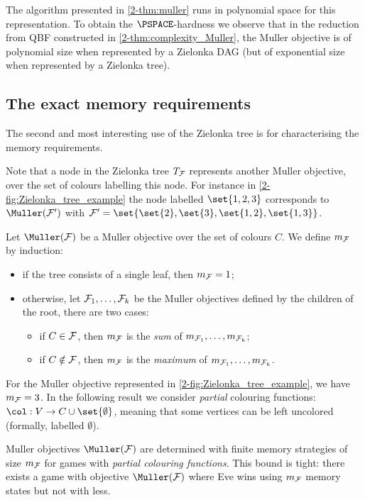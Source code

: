 The algorithm presented in \cref{2-thm:muller} runs in polynomial space for this representation.
To obtain the $\PSPACE$-hardness we observe that in the reduction from QBF constructed in \cref{2-thm:complexity_Muller},
the Muller objective is of polynomial size when represented by a Zielonka DAG (but of exponential size when represented by a Zielonka tree).

\subsection*{The exact memory requirements}
The second and most interesting use of the Zielonka tree is for characterising the memory requirements.

Note that a node in the Zielonka tree $T_{\mathcal{F}}$ represents another Muller objective, over the set of colours labelling this node.
For instance in \cref{2-fig:Zielonka_tree_example} the node labelled $\set{1,2,3}$ corresponds to $\Muller(\F')$ with
$\F' = \set{\set{2}, \set{3}, \set{1,2}, \set{1,3}}$.

\begin{definition}
\label{2-def:memory_requirements_Muller_objectives}
Let $\Muller(\F)$ be a Muller objective over the set of colours $C$.
We define $m_{\mathcal{F}}$ by induction:
\begin{itemize}
	\item if the tree consists of a single leaf, then $m_{\mathcal{F}} = 1$;
	\item otherwise, let $\mathcal{F}_1,\dots,\mathcal{F}_k$ be the Muller objectives defined by the children of the root,
	there are two cases:
	\begin{itemize}
		\item if $C \in \mathcal{F}$, then $m_{\mathcal{F}}$ is the \textit{sum} of $m_{\mathcal{F}_1},\dots,m_{\mathcal{F}_k}$;
		\item if $C \notin \mathcal{F}$, then $m_{\mathcal{F}}$ is the \textit{maximum} of $m_{\mathcal{F}_1},\dots,m_{\mathcal{F}_k}$.
	\end{itemize}
\end{itemize}
\end{definition}

For the Muller objective represented in \cref{2-fig:Zielonka_tree_example}, we have $m_{\mathcal{F}} = 3$.
In the following result we consider \textit{partial} colouring functions: $\col : V \to C \cup \set{\emptyset}$,
meaning that some vertices can be left uncolored (formally, labelled $\emptyset$).

\begin{theorem}
\label{2-thm:characterisation_Zielonka_tree}
Muller objectives $\Muller(\F)$ are determined with finite memory strategies of size $m_{\mathcal{F}}$
for games with \textit{partial colouring functions}.
This bound is tight: there exists a game with objective $\Muller(\F)$ where Eve wins using $m_{\mathcal{F}}$ memory states
but not with less.
\end{theorem}

